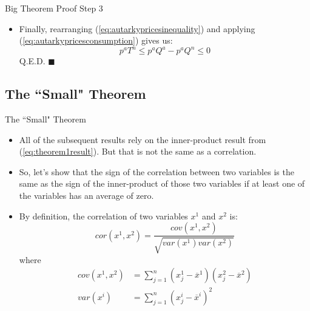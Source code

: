 \documentclass[aspectratio=169]{beamer}
\begin{document}

\begin{frame}{Big Theorem Proof Step 3}

\begin{itemize}
    \item Finally, rearranging (\ref{eq:autarkypricesinequality}) and applying (\ref{eq:autarkypricesconsumption}) gives us:
    \begin{equation}
        p^{a} T^{n} \le p^{a} Q^{a} - p^{a} Q^{n} \le 0
    \end{equation}
    Q.E.D. $\blacksquare$
\end{itemize}
    
\end{frame}


\subsection{The ``Small" Theorem}


\begin{frame}{The ``Small" Theorem}

\begin{itemize}
    \item<1-> All of the subsequent results rely on the inner-product result from (\ref{eq:theorem1result}).  But that is not the same as a correlation.
    \item<2-> So, let’s show that the sign of the correlation between two variables is the same as the sign of the inner-product of those two variables if at least one of the variables has an average of zero.
    \item<3-> By definition, the correlation of two variables $ x^1 $ and $ x^2 $ is:
    \begin{equation}
        cor \left( x^{1}, x^{2} \right) = \frac{cov \left( x^{1}, x^{2} \right)}{\sqrt{var\left( x^{1} \right) var\left( x^{2} \right)}}
        \label{eq:correlationdef}
    \end{equation}
    where
    \small{
    \begin{align*}
        cov \left( x^{1}, x^{2} \right) &= \sum_{j=1}^{n} \left( x_{j}^{1} - \overline{x}^{1} \right) \left( x_{j}^{2} - \overline{x}^{2} \right) \\
        var\left( x^{i} \right) &= \sum_{j=1}^{n} \left( x_{j}^{i} - \overline{x}^{i} \right)^{2}
    \end{align*}
    }
\end{itemize}
    
\end{frame}
\end{document}
